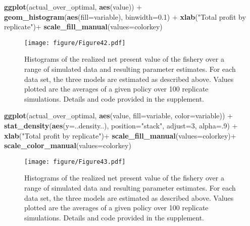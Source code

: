 \documentclass[author-year, review]{elsarticle} %
\makeatletter
\newenvironment{Shaded}{}{}
\newcommand{\KeywordTok}[1]{\textcolor[rgb]{0.00,0.44,0.13}{\textbf{{#1}}}}
\newcommand{\DataTypeTok}[1]{\textcolor[rgb]{0.56,0.13,0.00}{{#1}}}
\newcommand{\DecValTok}[1]{\textcolor[rgb]{0.25,0.63,0.44}{{#1}}}
\newcommand{\FloatTok}[1]{\textcolor[rgb]{0.25,0.63,0.44}{{#1}}}
\newcommand{\StringTok}[1]{\textcolor[rgb]{0.25,0.44,0.63}{{#1}}}
\newcommand{\NormalTok}[1]{{#1}}
\def\maxwidth{\ifdim\Gin@nat@width>\linewidth\linewidth
\else\Gin@nat@width\fi}
\let\Oldincludegraphics\includegraphics
\renewcommand{\includegraphics}[1]{\Oldincludegraphics[width=\maxwidth]{#1}}
\makeatother
\begin{document}
\begin{Shaded}
\begin{Highlighting}[]

\KeywordTok{ggplot}\NormalTok{(actual_over_optimal, }\KeywordTok{aes}\NormalTok{(value)) + }\KeywordTok{geom_histogram}\NormalTok{(}\KeywordTok{aes}\NormalTok{(}\DataTypeTok{fill=}\NormalTok{variable), }\DataTypeTok{binwidth=}\FloatTok{0.1}\NormalTok{) + }
  \KeywordTok{xlab}\NormalTok{(}\StringTok{"Total profit by replicate"}\NormalTok{)+ }\KeywordTok{scale_fill_manual}\NormalTok{(}\DataTypeTok{values=}\NormalTok{colorkey)}
\end{Highlighting}
\end{Shaded}

\begin{figure}[htbp]
\centering
\texttt{[image: figure/Figure42.pdf]}
\caption{Histograms of the realized net present value of the fishery
over a range of simulated data and resulting parameter estimates. For
each data set, the three models are estimated as described above. Values
plotted are the averages of a given policy over 100 replicate
simulations. Details and code provided in the supplement.}
\end{figure}

\begin{Shaded}
\begin{Highlighting}[]

\KeywordTok{ggplot}\NormalTok{(actual_over_optimal, }\KeywordTok{aes}\NormalTok{(value, }\DataTypeTok{fill=}\NormalTok{variable, }\DataTypeTok{color=}\NormalTok{variable)) + }
  \KeywordTok{stat_density}\NormalTok{(}\KeywordTok{aes}\NormalTok{(}\DataTypeTok{y=}\NormalTok{..density..), }\DataTypeTok{position=}\StringTok{"stack"}\NormalTok{, }\DataTypeTok{adjust=}\DecValTok{3}\NormalTok{, }\DataTypeTok{alpha=}\NormalTok{.}\DecValTok{9}\NormalTok{) + }
  \KeywordTok{xlab}\NormalTok{(}\StringTok{"Total profit by replicate"}\NormalTok{)+ }\KeywordTok{scale_fill_manual}\NormalTok{(}\DataTypeTok{values=}\NormalTok{colorkey)+ }\KeywordTok{scale_color_manual}\NormalTok{(}\DataTypeTok{values=}\NormalTok{colorkey)}
\end{Highlighting}
\end{Shaded}

\begin{figure}[htbp]
\centering
\texttt{[image: figure/Figure43.pdf]}
\caption{Histograms of the realized net present value of the fishery
over a range of simulated data and resulting parameter estimates. For
each data set, the three models are estimated as described above. Values
plotted are the averages of a given policy over 100 replicate
simulations. Details and code provided in the supplement.}
\end{figure}
\end{document}
